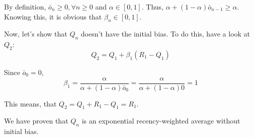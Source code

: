 \documentclass[12pt, a4paper]{article}
\begin{document}
        By definition, $\bar{o}_n \geq 0, \forall n \geq 0$ and $\alpha \in [0, 1]$. Thus, $\alpha + (1 - \alpha) \bar{o}_{n-1} \geq \alpha$.
        Knowing this, it is obvious that $\beta_n \in [0, 1]$.

        Now, let's show that $Q_n$ doesn't have the initial bias. To do this, have a look at $Q_2$:
        $$Q_2 = Q_1 + \beta_1 (R_1 - Q_1)$$

        Since $\bar{o}_0 = 0$,
        $$\beta_1 = \frac{\alpha}{\alpha + (1 - \alpha) \bar{o}_{0}} = \frac{\alpha}{\alpha + (1 - \alpha) 0} = 1$$

        This means, that $Q_2 = Q_1 + R_1 - Q_1 = R_1$.

        We have proven that $Q_n$ is an exponential recency-weighted average without initial bias.
\end{document}
